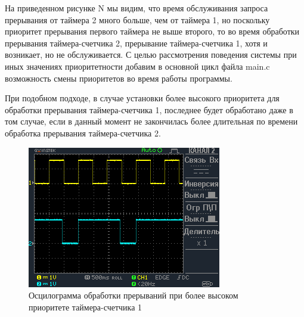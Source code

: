 \documentclass[14pt,a4paper,report]{report}
\begin{document}
На приведенном рисунке N мы видим, что  время обслуживания запроса прерывания от таймера 2 много больше, чем от таймера 1, но поскольку приоритет прерывания первого таймера не выше второго, то во время обработки прерывания таймера-счетчика 2, прерывание таймера-счетчика 1, хотя и возникает, но не обслуживается.
С целью рассмотрения поведения системы при иных значениях приоритетности добавим в основной цикл файла main.c возможность смены приоритетов во время работы программы.

При подобном подходе, в случае установки более высокого приоритета для обработки прерывания таймера-счетчика 1, последнее будет обработано даже в том случае, если в данный момент не закончилась более длительная по времени обработка прерывания таймера-счетчика 2. 

\begin{figure}[h!]
	\centering
	\includegraphics[scale = 1]{img/2_2.png}
	\caption{Осцилограмма обработки прерываний при более высоком приоритете таймера-счетчика 1}
\end{figure}
 
\end{document}
